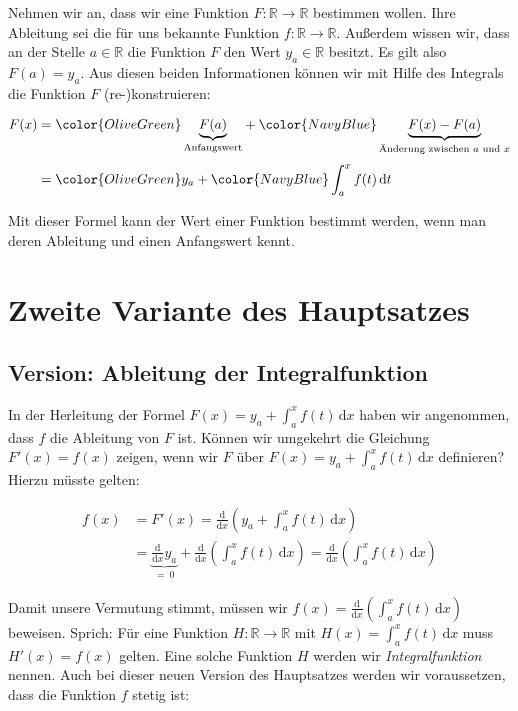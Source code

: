 \documentclass[fontsize=9pt,
               parskip=half-,
               DIV=14,
               listof=chapterentry,
               tocflat]{scrbook}
\begin{document}
Nehmen wir an, dass wir eine Funktion $F:\mathbb {R} \to \mathbb {R} $ bestimmen wollen. Ihre Ableitung sei die für uns bekannte Funktion $f:\mathbb {R} \to \mathbb {R} $. Außerdem wissen wir, dass an der Stelle $a\in \mathbb {R} $ die Funktion $F$ den Wert $y_{a}\in \mathbb {R} $ besitzt. Es gilt also $F(a)=y_{a}$. Aus diesen beiden Informationen können wir mit Hilfe des Integrals die Funktion $F$ (re-)konstruieren:

\begin{align*}
F(x)&={\color {OliveGreen}\underbrace {F(a)} _{\text{Anfangswert}}}+{\color {NavyBlue}\underbrace {F(x)-F(a)} _{{\text{Änderung zwischen }}a{\text{ und }}x}}\\[0.3em]&={\color {OliveGreen}y_{a}}+{\color {NavyBlue}\int _{a}^{x}f(t)\,\mathrm {d} t}
\end{align*}

Mit dieser Formel kann der Wert einer Funktion bestimmt werden, wenn man deren Ableitung und einen Anfangswert kennt.

\section{Zweite Variante des Hauptsatzes}

\subsection{Version: Ableitung der Integralfunktion}

In der Herleitung der Formel $F(x)=y_{a}+\int _{a}^{x}f(t)\,\mathrm {d} x$ haben wir angenommen, dass $f$ die Ableitung von $F$ ist. Können wir umgekehrt die Gleichung $F'(x)=f(x)$ zeigen, wenn wir $F$ über $F(x)=y_{a}+\int _{a}^{x}f(t)\,\mathrm {d} x$ definieren? Hierzu müsste gelten:

\begin{align*}
f(x)&=F'(x)={\frac {\mathrm {d} }{\mathrm {d} x}}\left(y_{a}+\int _{a}^{x}f(t)\,\mathrm {d} x\right)\\[0.5em]&=\underbrace {{\frac {\mathrm {d} }{\mathrm {d} x}}y_{a}} _{=\ 0}+{\frac {\mathrm {d} }{\mathrm {d} x}}\left(\int _{a}^{x}f(t)\,\mathrm {d} x\right)={\frac {\mathrm {d} }{\mathrm {d} x}}\left(\int _{a}^{x}f(t)\,\mathrm {d} x\right)
\end{align*}

Damit unsere Vermutung stimmt, müssen wir $f(x)={\frac {\mathrm {d} }{\mathrm {d} x}}\left(\int _{a}^{x}f(t)\,\mathrm {d} x\right)$ beweisen. Sprich: Für eine Funktion $H:\mathbb {R} \to \mathbb {R} $ mit $H(x)=\int _{a}^{x}f(t)\,\mathrm {d} x$ muss $H'(x)=f(x)$ gelten. Eine solche Funktion $H$ werden wir \emph{Integralfunktion} nennen. Auch bei dieser neuen Version des Hauptsatzes werden wir voraussetzen, dass die Funktion $f$ stetig ist:
\end{document}
